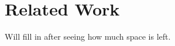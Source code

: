 \section{Related Work}
\label{sec:related}

Will fill in after seeing how much space is left. \\

\begin{comment}
We briefly discuss related work that is not covered in~\cref{sec:background}.

\para{Implementing cryptographic algorithms on programm-able switches}
There have been several efforts on implementing cryptographic primitives on programmable switches like encryption schemes (e.g., P4-AES~\cite{2020-SPIN-P4AES}, ChaCha~\cite{2022-EuroP4-ChaCha}), and secure keyed hash functions (SipHash~\cite{2021-SPIN-HalfSipHash}).
However, existing schemes cannot provide the three necessary security properties to ensure end-to-end secure communication, and thus \sysname is orthogonal with the aforementioned.
This also makes \aead the first cryptographic primitive in the data plane to support secure communication channels.
While one can compose P4-AES and SipHash to construct an authenticated encryption scheme, it is not proven to be secure~\cite{rogaway2002authenticated} and it requires more dedicated hardware resources.
Further, the P4-AES approach is not scalable, as the number of sessions is strictly limited by the memory available to maintain the per-key precomputed lookup tables.
In contrast, \aead requires little memory (see~\cref{sec:implementation}) to maintain the constants (i.e., 12 $\times$ 16-bit numbers) used for the {\pround}s.
Given the low resource requirement of \ascon, it can be integrated into and co-exist with existing data plane programs to secure the in-band communication channels.
\end{comment}